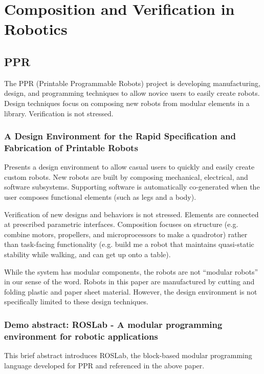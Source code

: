 \documentclass[12pt]{article}
\begin{document}
\section*{Composition and Verification in Robotics }
\subsection*{PPR}
The PPR (Printable Programmable Robots) project   is developing manufacturing, design, and programming techniques to allow
novice users to easily create robots.  Design techniques focus on composing new robots from modular elements in a library. Verification
is not stressed. 

\subsubsection*{A Design Environment for the Rapid Specification and Fabrication
of Printable Robots \cite{mehta2014design} }

Presents a design environment to allow casual users to quickly and easily create
custom robots.  New robots are built by composing mechanical, electrical, and software
subsystems.  Supporting software is automatically co-generated when the user composes
functional elements (such as legs and a body).

Verification of new designs and behaviors is not stressed.  Elements are connected
at prescribed parametric interfaces. Composition focuses on structure (e.g. combine motors, propellers, and microprocessors to make
a quadrotor) rather than task-facing functionality (e.g. build me a robot that maintains
quasi-static stability while walking, and can get up onto a table).   

While the system has modular components, the robots are not ``modular robots'' in
our sense of the word.  Robots in this paper are manufactured  by cutting and folding
plastic and paper sheet material. However, the design environment is not specifically
limited to these design techniques.


\subsubsection*{Demo abstract: ROSLab - A modular programming environment for robotic
applications \cite{bezzo2014demo} }
This brief abstract introduces ROSLab, the block-based modular programming language
developed for PPR and referenced in the above paper.
\end{document}

